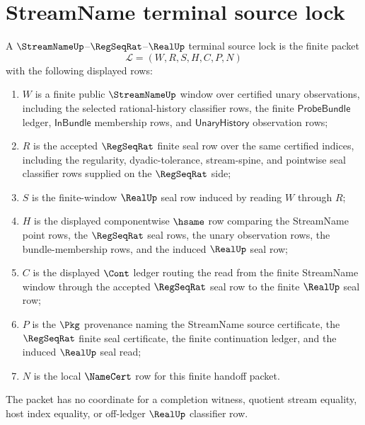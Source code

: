 \section{StreamName terminal source lock}
\label{sec:streamname-terminal-source-lock}

\begin{definition}
\label{def:streamname-regseqrat-realup-terminal-source-lock}
A $\StreamNameUp$--$\RegSeqRat$--$\RealUp$ terminal source lock is the finite
packet
$$
\mathcal{L}=(W,R,S,H,C,P,N)
$$
with the following displayed rows:
\begin{enumerate}
\item $W$ is a finite public $\StreamNameUp$ window over certified unary
observations, including the selected rational-history classifier rows, the
finite $\mathsf{ProbeBundle}$ ledger, $\mathsf{InBundle}$ membership rows, and
$\mathsf{UnaryHistory}$ observation rows;
\item $R$ is the accepted $\RegSeqRat$ finite seal row over the same certified
indices, including the regularity, dyadic-tolerance, stream-spine, and
pointwise seal classifier rows supplied on the $\RegSeqRat$ side;
\item $S$ is the finite-window $\RealUp$ seal row induced by reading $W$
through $R$;
\item $H$ is the displayed componentwise $\hsame$ row comparing the
StreamName point rows, the $\RegSeqRat$ seal rows, the unary observation rows,
the bundle-membership rows, and the induced $\RealUp$ seal row;
\item $C$ is the displayed $\Cont$ ledger routing the read from the finite
StreamName window through the accepted $\RegSeqRat$ seal row to the finite
$\RealUp$ seal row;
\item $P$ is the $\Pkg$ provenance naming the StreamName source certificate,
the $\RegSeqRat$ finite seal certificate, the finite continuation ledger, and
the induced $\RealUp$ seal read;
\item $N$ is the local $\NameCert$ row for this finite handoff packet.
\end{enumerate}
The packet has no coordinate for a completion witness, quotient stream
equality, host index equality, or off-ledger $\RealUp$ classifier row.
\end{definition}

